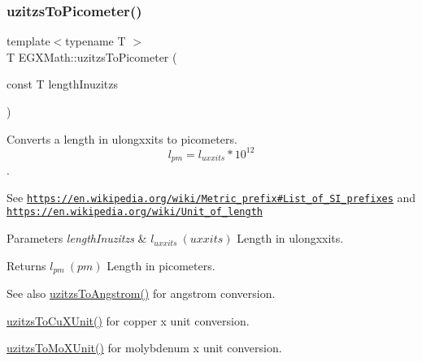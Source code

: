 \subsubsection{\texorpdfstring{uzitzs\+To\+Picometer()}{uzitzsToPicometer()}}
{\footnotesize\ttfamily template$<$typename T $>$ \\
T E\+G\+X\+Math\+::uzitzs\+To\+Picometer (\begin{DoxyParamCaption}\item[{const T}]{length\+Inuzitzs }\end{DoxyParamCaption})}



Converts a length in ulongxxits to picometers. \[ l_{pm}=l_{uxxits} * 10^{12} \]. 

See \href{https://en.wikipedia.org/wiki/Metric_prefix#List_of_SI_prefixes}{\tt https\+://en.\+wikipedia.\+org/wiki/\+Metric\+\_\+prefix\#\+List\+\_\+of\+\_\+\+S\+I\+\_\+prefixes} and \href{https://en.wikipedia.org/wiki/Unit_of_length}{\tt https\+://en.\+wikipedia.\+org/wiki/\+Unit\+\_\+of\+\_\+length} 
\begin{DoxyParams}{Parameters}
{\em length\+Inuzitzs} & $ l_{uxxits}\ (uxxits)$ Length in ulongxxits. \\
\hline
\end{DoxyParams}
\begin{DoxyReturn}{Returns}
$ l_{pm}\ (pm)$ Length in picometers. 
\end{DoxyReturn}
\begin{DoxySeeAlso}{See also}
\mbox{\hyperlink{group___e_g_x_math-_conversions-_length_conversions-_non-_s_i-uzitzs-_non-_s_i_gaaaecee65b1db5abcc71e18526e7073eb}{uzitzs\+To\+Angstrom()}} for angstrom conversion. 

\mbox{\hyperlink{group___e_g_x_math-_conversions-_length_conversions-_non-_s_i-uzitzs-_non-_s_i_gab25470e41b88c41d4bf32622baa6c472}{uzitzs\+To\+Cu\+X\+Unit()}} for copper x unit conversion. 

\mbox{\hyperlink{group___e_g_x_math-_conversions-_length_conversions-_non-_s_i-uzitzs-_non-_s_i_ga64b556911b0bb06cf315aa02f5e2d379}{uzitzs\+To\+Mo\+X\+Unit()}} for molybdenum x unit conversion. 
\end{DoxySeeAlso}
\mbox{\label{group___e_g_x_math-_conversions-_length_conversions-_non-_s_i-uzitzs-_s_i_gaed1a457a06ea3b69a4c63414b08b03a3}} 
